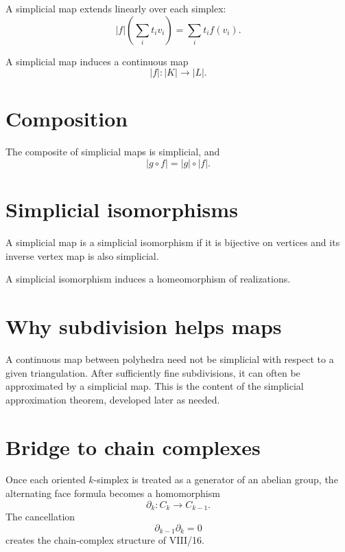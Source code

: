 A simplicial map extends linearly over each simplex:
\[
|f|\left(\sum_i t_iv_i\right)
=
\sum_i t_i f(v_i).
\]

\begin{theorem}
\label{thm:viii15-map-continuity}
A simplicial map induces a continuous map
\[
|f|:|K|\to|L|.
\]
\end{theorem}

\section{Composition}

\begin{proposition}[Functoriality]
\label{prop:viii15-map-functorial}
The composite of simplicial maps is simplicial, and
\[
|g\circ f|=|g|\circ|f|.
\]
\end{proposition}

\section{Simplicial isomorphisms}

\begin{definition}
\label{def:viii15-simplicial-iso}
A simplicial map is a simplicial isomorphism if it is bijective on vertices and
its inverse vertex map is also simplicial.
\end{definition}

A simplicial isomorphism induces a homeomorphism of realizations.

\section{Why subdivision helps maps}

A continuous map between polyhedra need not be simplicial with respect to a
given triangulation.  After sufficiently fine subdivisions, it can often be
approximated by a simplicial map.  This is the content of the simplicial
approximation theorem, developed later as needed.

\section{Bridge to chain complexes}

Once each oriented \(k\)-simplex is treated as a generator of an abelian group,
the alternating face formula becomes a homomorphism
\[
\partial_k:C_k\to C_{k-1}.
\]
The cancellation
\[
\partial_{k-1}\partial_k=0
\]
creates the chain-complex structure of VIII/16.


